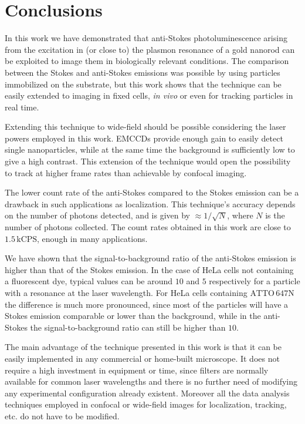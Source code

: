 \documentclass[journal=nalefd,manuscript=letter]{achemso}
\newcommand{\kCPS}{\ensuremath{\,\textrm{kCPS}}}
\newcommand{\atto}{\ensuremath{\textrm{ATTO}\,647\textrm{N}}}
\begin{document}
\section{Conclusions}
In this work we have demonstrated that anti-Stokes photoluminescence arising
from the excitation in (or close to) the plasmon resonance of a gold nanorod can be
exploited to image them in biologically relevant conditions\cite{Jiang2013}. The
comparison between the Stokes and anti-Stokes emissions was possible by using
particles immobilized on the substrate, but this work shows that the technique
can be easily extended to imaging in fixed cells, \textit{in vivo} or even for
tracking particles in real time\cite{VandenBroek2013}.

Extending this technique to wide-field should be possible considering the laser
powers employed in this work. EMCCDs provide enough gain\cite{Dussault2004} to
easily detect single nanoparticles, while at the same time the background is
sufficiently low to give a high contrast. This extension of the technique would
open the possibility to track at higher frame rates than achievable by
confocal imaging.

The lower count rate of the anti-Stokes compared to the Stokes emission can be a
drawback in such applications as localization\cite{Sahl2013}. This technique's
accuracy depends on the number of photons detected, and is given by $\approx
1/\sqrt{N}$, where $N$ is the number of photons collected. The count rates
obtained in this work are close to $1.5\kCPS$, enough in many applications.

We have shown that the signal-to-background ratio of the anti-Stokes emission is
higher than that of the Stokes emission. In the case of HeLa cells not containing a
fluorescent dye, typical values can be around $10$ and $5$ respectively for a
particle with a resonance at the laser wavelength. For HeLa cells containing
$\atto$ the difference is much more pronounced, since most of the particles will
have a Stokes emission comparable or lower than the background, while in the anti-Stokes the
signal-to-background ratio can still be higher than $10$.

The main advantage of the technique presented in this work is that it can be
easily implemented in any commercial or home-built microscope. It does not
require a high investment in equipment or time, since filters are normally
available for common laser wavelengths and there is no further need of modifying
any experimental configuration already existent. Moreover all the data analysis
techniques employed in confocal or wide-field images for localization, tracking,
etc. do not have to be modified.


\end{document}

